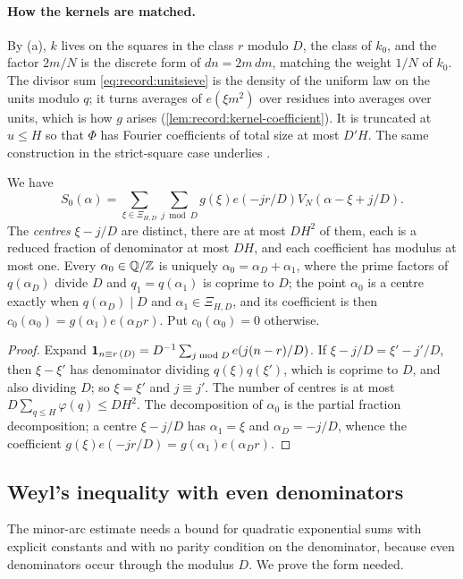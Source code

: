 \paragraph{How the kernels are matched.}
By (a), $k$ lives on the squares in the class $r$ modulo $D$, the class of
$k_0$, and the factor $2m/N$ is the discrete form of $dn=2m\,dm$, matching the
weight $1/N$ of $k_0$. The divisor sum \eqref{eq:record:unitsieve} is the
density of the uniform law on the units modulo $q$; it turns averages of
$e(\xi m^2)$ over residues into averages over units, which is how $g$ arises
(\cref{lem:record:kernel-coefficient}). It is truncated at $u\le H$ so that
$\Phi$ has Fourier coefficients of total size at most $D'H$. The same
construction in the strict-square case underlies \cite[Prop.~6.1]{OpenAI}.

\begin{lemma}
\label{lem:record:K20-centres}
We have
\[
 S_0(\alpha)=\sum_{\xi\in\Xi_{H,D}}\sum_{j\bmod D}g(\xi)e(-jr/D)
 V_N(\alpha-\xi+j/D).
\]
The \emph{centres} $\xi-j/D$ are distinct, there are at most $DH^2$ of them,
each is a reduced fraction of denominator at most $DH$, and each coefficient
has modulus at most one. Every $\alpha_0\in\mathbb Q/\mathbb Z$ is uniquely
$\alpha_0=\alpha_D+\alpha_1$, where the prime factors of $q(\alpha_D)$ divide
$D$ and $q_1=q(\alpha_1)$ is coprime to $D$; the point $\alpha_0$ is a centre
exactly when $q(\alpha_D)\mid D$ and $\alpha_1\in\Xi_{H,D}$, and its
coefficient is then $c_0(\alpha_0)=g(\alpha_1)e(\alpha_Dr)$. Put
$c_0(\alpha_0)=0$ otherwise.
\end{lemma}

\begin{proof}
Expand $\mathbf 1_{n\equiv r\,(D)}=D^{-1}\sum_{j\bmod D}e(j(n-r)/D)$. If
$\xi-j/D=\xi'-j'/D$, then $\xi-\xi'$ has denominator dividing
$q(\xi)q(\xi')$, which is coprime to $D$, and also dividing $D$; so
$\xi=\xi'$ and $j\equiv j'$. The number of centres is at most
$D\sum_{q\le H}\varphi(q)\le DH^2$. The decomposition of $\alpha_0$ is the
partial fraction decomposition; a centre $\xi-j/D$ has $\alpha_1=\xi$ and
$\alpha_D=-j/D$, whence the coefficient $g(\xi)e(-jr/D)=g(\alpha_1)e(\alpha_Dr)$.
\end{proof}

\subsection{Weyl's inequality with even denominators}

The minor-arc estimate needs a bound for quadratic exponential
sums with explicit constants and with no parity condition on the
denominator, because even denominators occur through the modulus
$D$. We prove the form needed.

